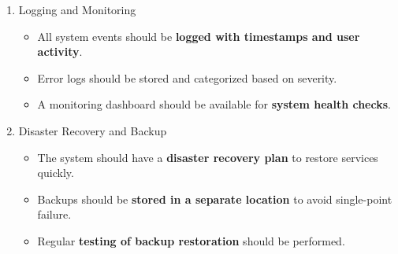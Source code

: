 \begin{enumerate}
    \item Logging and Monitoring
    \begin{itemize}
        \item All system events should be \textbf{logged with timestamps and user activity}.
        \item Error logs should be stored and categorized based on severity.
        \item A monitoring dashboard should be available for \textbf{system health checks}.
    \end{itemize}

    \item Disaster Recovery and Backup
    \begin{itemize}
        \item The system should have a \textbf{disaster recovery plan} to restore services quickly.
        \item Backups should be \textbf{stored in a separate location} to avoid single-point failure.
        \item Regular \textbf{testing of backup restoration} should be performed.
    \end{itemize}
\end{enumerate}